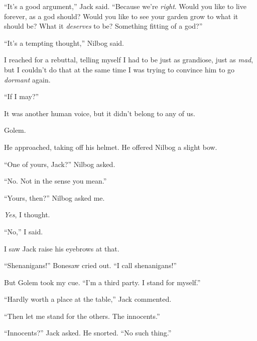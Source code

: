 ``It's a good argument,'' Jack said.  ``Because we're \emph{right}.  Would you like to live forever, as a god should?  Would you like to see your garden grow to what it should be?  What it \emph{deserves} to be?  Something fitting of a god?''



``It's a tempting thought,'' Nilbog said.



I reached for a rebuttal, telling myself I had to be just as grandiose, just as \emph{mad}, but I couldn't do that at the same time I was trying to convince him to go \emph{dormant} again.



``If I may?''



It was another human voice, but it didn't belong to any of us.



Golem.



He approached, taking off his helmet.  He offered Nilbog a slight bow.



``One of yours, Jack?'' Nilbog asked.



``No.  Not in the sense you mean.''



``Yours, then?'' Nilbog asked me.



\emph{Yes}, I thought.



``No,'' I said.



I saw Jack raise his eyebrows at that.



``Shenanigans!'' Bonesaw cried out.  ``I call shenanigans!''



But Golem took my cue.  ``I'm a third party.  I stand for myself.''



``Hardly worth a place at the table,'' Jack commented.



``Then let me stand for the others.  The innocents.''



``Innocents?'' Jack asked.  He snorted.  ``No such thing.''



